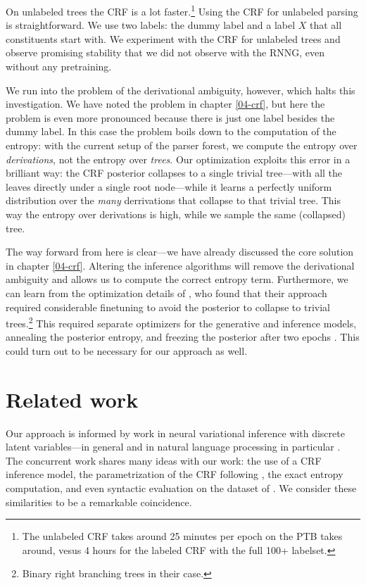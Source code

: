     On unlabeled trees the CRF is a lot faster.\footnote{The unlabeled CRF takes around 25 minutes per epoch on the PTB takes around, vesus 4 hours for the labeled CRF with the full 100+ labelset.} Using the CRF for unlabeled parsing is straightforward. We use two labels: the dummy label and a label $X$ that all constituents start with. We experiment with the CRF for unlabeled trees and observe promising stability that we did not observe with the RNNG, even without any pretraining.

    We run into the problem of the derivational ambiguity, however, which halts this investigation. We have noted the problem in chapter \ref{04-crf}, but here the problem is even more pronounced because there is just one label besides the dummy label. In this case the problem boils down to the computation of the entropy: with the current setup of the parser forest, we compute the entropy over \textit{derivations}, not the entropy over \textit{trees}. Our optimization exploits this error in a brilliant way: the CRF posterior collapses to a single trivial tree---with all the leaves directly under a single root node---while it learns a perfectly uniform distribution over the \textit{many} derrivations that collapse to that trivial tree. This way the entropy over derivations is high, while we sample the same (collapsed) tree.

    The way forward from here is clear---we have already discussed the core solution in chapter \ref{04-crf}. Altering the inference algorithms will remove the derivational ambiguity and allows us to compute the correct entropy term. Furthermore, we can learn from the optimization details of \citet{kim2019unsupervised}, who found that their approach required considerable finetuning to avoid the posterior to collapse to trivial trees.\footnote{Binary right branching trees in their case.} This required separate optimizers for the generative and inference models, annealing the posterior entropy, and freezing the posterior after two epochs \citep{kim2019unsupervised}. This could turn out to be necessary for our approach as well.

\section{Related work}
  Our approach is informed by work in neural variational inference with discrete latent variables---in general \citep{paisley2012viss,mnih2014nvil,ranganath2014black,mnih2016variational} and in natural language processing in particular \citep{miao2016discrete,yin2018structvae}. The concurrent work \citet{kim2019unsupervised} shares many ideas with our work: the use of a CRF inference model, the parametrization of the CRF following \citet{stern2017minimal}, the exact entropy computation, and even syntactic evaluation on the dataset of \citet{linzen2018targeted}. We consider these similarities to be a remarkable coincidence.


